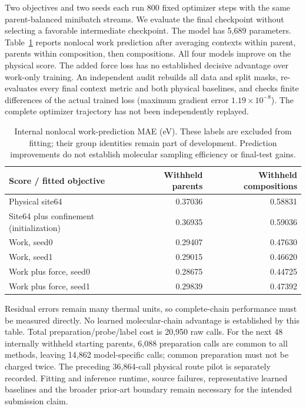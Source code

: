 Two objectives and two seeds each run 800 fixed optimizer steps with the same
parent-balanced minibatch streams. We evaluate the final checkpoint without
selecting a favorable intermediate checkpoint. The model has 5,689 parameters.
Table~\ref{tab:nonlocal-prediction} reports nonlocal work prediction after
averaging contexts within parent, parents within composition, then compositions.
All four models improve on the physical score. The added force loss has no
established decisive advantage over work-only training. An independent audit
rebuilds all data and split masks, re-evaluates every final context metric and
both physical baselines, and checks finite differences of the actual trained
loss (maximum gradient error $1.19\times10^{-8}$). The complete optimizer
trajectory has not been independently replayed.

\begin{table}[t]
\centering
\caption{Internal nonlocal work-prediction MAE (eV). These labels are excluded
from fitting; their group identities remain part of development. Prediction
improvements do not establish molecular sampling efficiency or final-test gains.}
\label{tab:nonlocal-prediction}
\small
\begin{tabular}{lrr}
\toprule
Score / fitted objective & Withheld parents & Withheld compositions\\
\midrule
Physical site64 & 0.37036 & 0.58831\\
Site64 plus confinement (initialization) & 0.36935 & 0.59036\\
Work, seed0 & 0.29407 & 0.47630\\
Work, seed1 & 0.29015 & 0.46620\\
Work plus force, seed0 & 0.28675 & 0.44725\\
Work plus force, seed1 & 0.29839 & 0.47392\\
\bottomrule
\end{tabular}
\end{table}

Residual errors remain many thermal units, so complete-chain performance must
be measured directly. No learned molecular-chain advantage is established by
this table. Total preparation/probe/label cost is 20,950 raw calls. For the next
48 internally withheld starting parents, 6,088 preparation calls are common to
all methods, leaving 14,862 model-specific calls; common preparation must not be
charged twice. The preceding 36,864-call physical route pilot is separately
recorded. Fitting and inference runtime, source failures, representative learned
baselines and the broader prior-art boundary remain necessary for the intended
submission claim.

